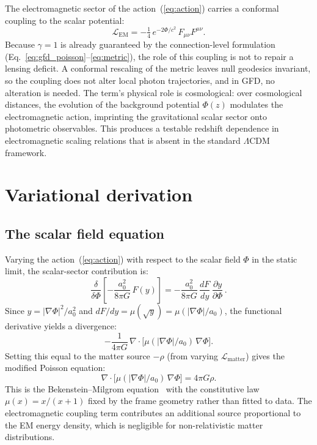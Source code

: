 \documentclass[11pt]{article}
\begin{document}
The electromagnetic sector of the
action~(\ref{eq:action}) carries a conformal coupling
to the scalar potential:
\begin{equation}
  \mathcal{L}_{\text{EM}}
    = -\tfrac{1}{4}\,e^{-2\Phi/c^2}\,
    F_{\mu\nu}F^{\mu\nu}.
  \label{eq:EM}
\end{equation}
Because $\gamma = 1$ is already guaranteed by the
connection-level formulation
(Eq.~\ref{eq:gfd_poisson}--\ref{eq:metric}), the
role of this coupling is not to repair a lensing deficit.
A conformal rescaling of the metric leaves null geodesics
invariant, so the coupling does not alter local photon
trajectories, and in GFD, no alteration is needed.
The term's physical role is cosmological: over
cosmological distances, the evolution of the background
potential $\Phi(z)$ modulates the electromagnetic action,
imprinting the gravitational scalar sector onto
photometric observables.  This produces a testable
redshift dependence in electromagnetic scaling relations
that is absent in the standard $\Lambda$CDM framework.

\section{Variational derivation}

\subsection*{The scalar field equation}

Varying the action~(\ref{eq:action}) with respect to the
scalar field $\Phi$ in the static limit, the scalar-sector
contribution is:
\begin{equation}
  \frac{\delta}{\delta\Phi}\left[
    -\frac{a_0^2}{8\pi G}\,F(y)
  \right]
  = -\frac{a_0^2}{8\pi G}\,\frac{dF}{dy}\,
    \frac{\partial y}{\partial\Phi}\,.
\end{equation}
Since $y = |\nabla\Phi|^2/a_0^2$ and
$dF/dy = \mu(\sqrt{y}) = \mu(|\nabla\Phi|/a_0)$,
the functional derivative yields a divergence:
\begin{equation}
  -\frac{1}{4\pi G}\,
  \nabla\!\cdot\!\bigl[
    \mu(|\nabla\Phi|/a_0)\,\nabla\Phi
  \bigr].
\end{equation}
Setting this equal to the matter source $-\rho$ (from
varying $\mathcal{L}_{\text{matter}}$) gives the
modified Poisson equation:
\begin{equation}
  \boxed{
  \nabla\!\cdot\!\bigl[
    \mu(|\nabla\Phi|/a_0)\,\nabla\Phi
  \bigr] = 4\pi G\rho.}
  \label{eq:modified_poisson}
\end{equation}
This is the Bekenstein--Milgrom
equation~\cite{BekensteinMilgrom1984} with the
constitutive law $\mu(x) = x/(x{+}1)$ fixed by the
frame geometry rather than fitted to data.
The electromagnetic coupling term contributes an
additional source proportional to the EM energy density,
which is negligible for non-relativistic matter
distributions.
\end{document}
